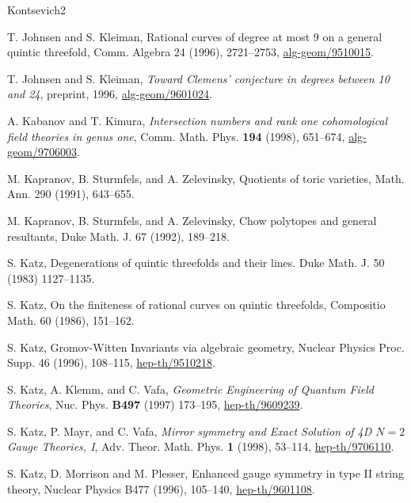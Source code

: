 \begin{thebibliography}{Kontsevich2}

\hypertarget{bib:JK1}{}
T. Johnsen and S. Kleiman,
Rational curves of degree at most 9 on a general quintic threefold,
Comm. Algebra 24 (1996), 2721--2753, \href{https://arxiv.org/abs/alg-geom/9510015}{alg-geom/9510015}.

\hypertarget{bib:JK2}{} T. Johnsen and S. Kleiman, \emph{Toward Clemens' conjecture in degrees between 10 and 24}, preprint, 1996, \href{https://arxiv.org/abs/alg-geom/9601024}{alg-geom/9601024}.

\hypertarget{bib:KK}{} A. Kabanov and T. Kimura, \emph{Intersection numbers and rank one cohomological field theories in genus one}, Comm. Math. Phys. \textbf{194} (1998), 651--674, \href{https://arxiv.org/abs/alg-geom/9706003}{alg-geom/9706003}.

\hypertarget{bib:KSZ1}{}
M. Kapranov, B. Sturmfels, and A. Zelevinsky, Quotients of toric varieties, Math. Ann. 290 (1991), 643--655.

\hypertarget{bib:KSZ2}{}
M. Kapranov, B. Sturmfels, and A. Zelevinsky, Chow polytopes and general resultants, Duke Math. J. 67 (1992), 189--218.

\hypertarget{bib:Katz1}{}
S. Katz, Degenerations of quintic threefolds and their lines. Duke Math. J. 50 (1983) 1127--1135.

\hypertarget{bib:Katz2}{}
S. Katz, On the finiteness of rational curves on quintic threefolds,
Compositio Math. 60 (1986), 151--162.

\hypertarget{bib:Katz3}{}
S. Katz, Gromov-Witten Invariants via algebraic geometry, Nuclear Physics Proc. Supp. 46 (1996), 108--115, \href{https://arxiv.org/abs/hep-th/9510218}{hep-th/9510218}.

\hypertarget{bib:KKV}{} S. Katz, A. Klemm, and C. Vafa, \emph{Geometric Engineering of Quantum Field Theories}, Nuc. Phys. \textbf{B497} (1997) 173--195, \href{https://arxiv.org/abs/hep-th/9609239}{hep-th/9609239}.

\hypertarget{bib:KMV}{} S. Katz, P. Mayr, and C. Vafa, \emph{Mirror symmetry and Exact Solution of 4D $N=2$ Gauge Theories, I}, Adv. Theor. Math. Phys. \textbf{1} (1998), 53--114, \href{https://arxiv.org/abs/hep-th/9706110}{hep-th/9706110}.

\hypertarget{bib:KMP}{}
S. Katz, D. Morrison and M. Plesser, Enhanced gauge symmetry in type II string theory, Nuclear Physics B477 (1996), 105--140, \href{https://arxiv.org/abs/hep-th/9601108}{hep-th/9601108}.


\end{thebibliography}
